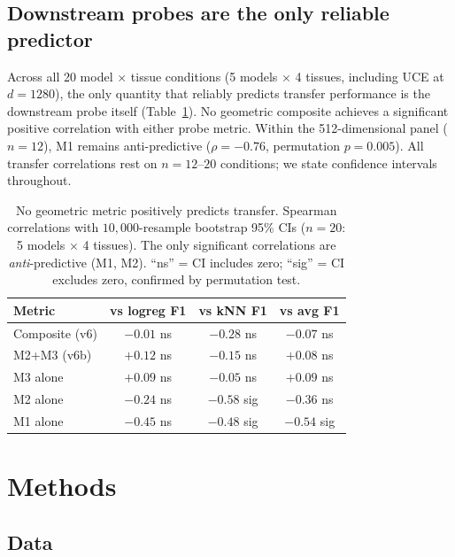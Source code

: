 \documentclass[10pt,letterpaper]{article}
\begin{document}
\subsection{Downstream probes are the only reliable predictor}

Across all 20 model $\times$ tissue conditions (5 models $\times$ 4 tissues, including UCE at $d = 1280$), the only quantity that reliably predicts transfer performance is the downstream probe itself (Table~\ref{tab:probes}). No geometric composite achieves a significant positive correlation with either probe metric. Within the 512-dimensional panel ($n = 12$), M1 remains anti-predictive ($\rho = -0.76$, permutation $p = 0.005$). All transfer correlations rest on $n = 12$--$20$ conditions; we state confidence intervals throughout.

\begin{table}[t]
\centering
\caption{No geometric metric positively predicts transfer. Spearman correlations with $10{,}000$-resample bootstrap 95\% CIs ($n = 20$: 5 models $\times$ 4 tissues). The only significant correlations are \emph{anti}-predictive (M1, M2). ``ns'' = CI includes zero; ``sig'' = CI excludes zero, confirmed by permutation test.}
\label{tab:probes}
\small
\begin{tabular}{@{}lccc@{}}
\toprule
Metric & vs logreg F1 & vs kNN F1 & vs avg F1 \\
\midrule
Composite (v6) & $-0.01$ ns & $-0.28$ ns & $-0.07$ ns \\
M2+M3 (v6b) & $+0.12$ ns & $-0.15$ ns & $+0.08$ ns \\
M3 alone & $+0.09$ ns & $-0.05$ ns & $+0.09$ ns \\
M2 alone & $-0.24$ ns & $\mathbf{-0.58}$ sig & $-0.36$ ns \\
M1 alone & $-0.45$ ns & $\mathbf{-0.48}$ sig & $\mathbf{-0.54}$ sig \\
\bottomrule
\end{tabular}
\end{table}


\section{Methods}

\subsection{Data}
\end{document}

